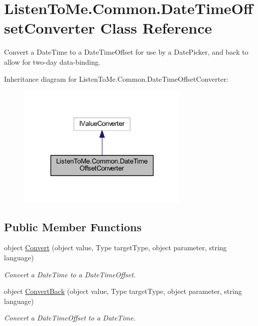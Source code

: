 \hypertarget{class_listen_to_me_1_1_common_1_1_date_time_offset_converter}{}\section{Listen\+To\+Me.\+Common.\+Date\+Time\+Offset\+Converter Class Reference}
\label{class_listen_to_me_1_1_common_1_1_date_time_offset_converter}


Convert a Date\+Time to a Date\+Time\+Offset for use by a Date\+Picker, and back to allow for two-\/day data-\/binding.  




Inheritance diagram for Listen\+To\+Me.\+Common.\+Date\+Time\+Offset\+Converter\+:\nopagebreak
\begin{figure}[H]
\begin{center}
\leavevmode
\includegraphics[width=233pt]{class_listen_to_me_1_1_common_1_1_date_time_offset_converter__inherit__graph}
\end{center}
\end{figure}
\subsection*{Public Member Functions}
\begin{DoxyCompactItemize}
\item 
object \hyperlink{class_listen_to_me_1_1_common_1_1_date_time_offset_converter_afe759bf69875dd6ce92331655502f189}{Convert} (object value, Type target\+Type, object parameter, string language)
\begin{DoxyCompactList}\small\item\em Convert a Date\+Time to a Date\+Time\+Offset. \end{DoxyCompactList}\item 
object \hyperlink{class_listen_to_me_1_1_common_1_1_date_time_offset_converter_aef90b6e6edb5fffaf53c91cdf25bcb3c}{Convert\+Back} (object value, Type target\+Type, object parameter, string language)
\begin{DoxyCompactList}\small\item\em Convert a Date\+Time\+Offset to a Date\+Time. \end{DoxyCompactList}\end{DoxyCompactItemize}



